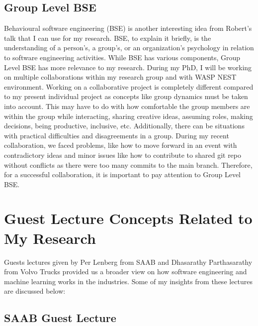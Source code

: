 \documentclass[a4paper, 11pt]{article}
\begin{document}
\subsection{Group Level BSE}
Behavioural software engineering (BSE) is another interesting idea from Robert's talk that I can use for my research. BSE, to explain it briefly, is the understanding of a person's, a group's, or an organization's psychology in relation to software engineering activities. While BSE has various components, Group Level BSE has more relevance to my research. During my PhD, I will be working on multiple collaborations within my research group and with WASP NEST environment. Working on a collaborative project is completely different compared to my present individual project as concepts like group dynamics must be taken into account. This may have to do with how comfortable the group members are within the group while interacting, sharing creative ideas, assuming roles, making decisions, being productive, inclusive, etc. Additionally, there can be situations with practical difficulties and disagreements in a group. During my recent collaboration, we faced problems, like how to move forward in an event with contradictory ideas and minor issues like how to contribute to shared git repo without conflicts as there were too many commits to the main branch. Therefore, for a successful collaboration, it is important to pay attention to Group Level BSE.

\section{Guest Lecture Concepts Related to My Research}
Guests lectures given by Per Lenberg from SAAB and Dhasarathy Parthasarathy from Volvo Trucks provided us a broader view on how software engineering and machine learning works in the industries. Some of my insights from these lectures are discussed below:

\subsection{SAAB Guest Lecture}
\end{document}
